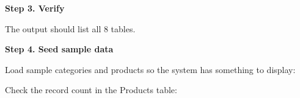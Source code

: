 \vspace{0.5em}\noindent\textbf{Step 3. Verify}\par

\begin{Shaded}
\begin{Highlighting}[]
\end{Highlighting}
\end{Shaded}

The output should list all 8 tables.

\vspace{0.5em}\noindent\textbf{Step 4. Seed sample data}\par

Load sample categories and products so the system has something to
display:

\begin{Shaded}
\begin{Highlighting}[]
\end{Highlighting}
\end{Shaded}

Check the record count in the Products table:

\begin{Shaded}
\begin{Highlighting}[]
\end{Highlighting}
\end{Shaded}
